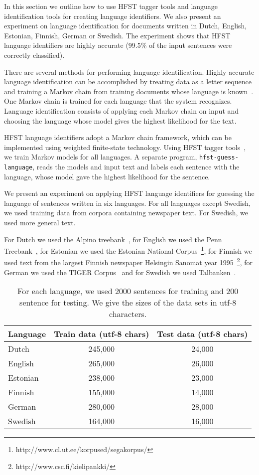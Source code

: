 \documentclass{llncs}
\begin{document}
In this section we outline how to use HFST tagger tools and language
identification tools for creating language identifiers. We also
present an experiment on language identification for documents written
in Dutch, English, Estonian, Finnish, German or Swedish. The
experiment shows that HFST language identifiers are highly accurate
(99.5\% of the input sentences were correctly classified).

There are several methods for performing language
identification. Highly accurate language identification can be
accomplished by treating data as a letter sequence and training
a Markov chain from training documents whose language is
known~\cite{cavnar/1994}. One Markov chain is trained for each
language that the system recognizes. Language identification consists
of applying each Markov chain on input and choosing the language whose
model gives the highest likelihood for the text. 

HFST language identifiers adopt a Markov chain framework, which can be
implemented using weighted finite-state technology. Using HFST tagger
tools~\cite{silfverberg/2011}, we train Markov models for all
languages. A separate program, {\tt hfst-guess-language}, reads the
models and input text and labels each sentence with the language,
whose model gave the highest likelihood for the sentence.

We present an experiment on applying HFST language identifiers for
guessing the language of sentences written in six languages. For all
languages except Swedish, we used training data from corpora
containing newspaper text. For Swedish, we used more general text.

For Dutch we used the Alpino treebank~\cite{bouma/2000}, for English
we used the Penn Treebank~\cite{marcus/1993}, for Estonian we used the
Estonian National
Corpus~\footnote{http://www.cl.ut.ee/korpused/segakorpus/}, for
Finnish we used text from the largest Finnish newspaper Helsingin
Sanomat year 1995~\footnote{http://www.csc.fi/kielipankki/}, for
German we used the TIGER Corpus~\cite{brants/2002} and for Swedish we
used Talbanken~\cite{einarsson/1976}.

\begin{table}
\begin{center}
\begin{tabular}{l|cc}
Language & Train data (utf-8 chars) & Test data (utf-8 chars)\\
\hline
Dutch    & 245,000  & 24,000\\
English  & 265,000  & 26,000\\
Estonian & 238,000  & 23,000\\
Finnish  & 155,000  & 14,000\\
German   & 280,000  & 28,000\\
Swedish  & 164,000  & 16,000\\
\end{tabular}
\caption{For each language, we used 2000 sentences for training and
  200 sentence for testing. We give the sizes of the data sets in
  utf-8 characters.}\label{tab:lang-id-data}
\end{center}
\end{table}
\end{document}
